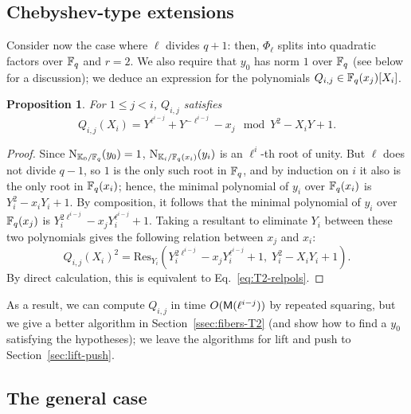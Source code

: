 \documentclass{sig-alternate}
\newtheorem{proposition}[definition]{Proposition}
\begin{document}

\subsection{Chebyshev-type extensions}
\label{ssec:T2}

Consider now the case where $\ell$ divides $q+1$: then, $\Phi_\ell$
splits into quadratic factors over $\mathbb{F}_q$ and $r=2$. We also require
that $y_0$ has norm $1$ over $\mathbb{F}_q$ (see below for a discussion); we
deduce an expression for the polynomials $Q_{i,j} \in
\mathbb{F}_q(x_{j})[X_i]$.

\begin{proposition}
  \label{th:T2-resultant}
  For $1 \le j < i$, $Q_{i,j}$ satisfies
  \begin{equation}
    \label{eq:T2-relpols}
    Q_{i,j}(X_i) = Y^{\ell^{i-j}} + Y^{-\ell^{i-j}} - x_j \mod Y^2-X_iY+1.
  \end{equation}
\end{proposition}
\begin{proof}
  Since $\operatorname{N}_{\mathbb{K}_0/\mathbb{F}_q}(y_0)=1$, $\operatorname{N}_{\mathbb{K}_i/\mathbb{F}_q(x_i)}(y_i)$ is
  an $\ell^i$-th root of unity. But $\ell$ does not divide $q-1$, so
  $1$ is the only such root in $\mathbb{F}_q$, and by induction on $i$ it also
  is the only root in $\mathbb{F}_q(x_i)$; hence, the minimal polynomial of
  $y_i$ over $\mathbb{F}_q(x_i)$ is $Y_i^2 -x_i Y_i +1$. By composition, it
  follows that the minimal polynomial of $y_i$ over $\mathbb{F}_q(x_{j})$ is
  $Y_i^{2\ell^{i-j}}-x_{j} Y_i^{\ell^{i-j}}+1$. Taking a resultant to
  eliminate $Y_i$
  between these two polynomials gives the following relation between
  $x_{j}$ and $x_i$:
  \begin{equation*}
    Q_{i,j}(X_i)^2 = \mathrm{Res}_{Y_i}(Y_i^{2\ell^{i-j}}-x_{j}Y_i^{\ell^{i-j}}+1,\; Y_i^2-X_i Y_i+1).
  \end{equation*}
  By direct calculation, this is equivalent to
  Eq.~\eqref{eq:T2-relpols}.
\end{proof}

As a result, we can compute $Q_{i,j}$ in time $O(\mathsf{M}(\ell^{i-j}))$
by repeated squaring, but we give a better algorithm in
Section~\ref{ssec:fibers-T2} (and show how to find a $y_0$ satisfying
the hypotheses); we leave the algorithms for lift and push to
Section~\ref{sec:lift-push}.


\subsection{The general case}\label{ssec:gal}
\end{document}
